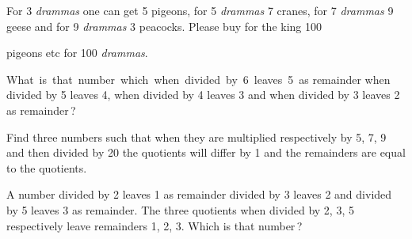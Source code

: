 \documentclass[]{article}
\begin{document}
{For 3 \textit{drammas} one can get 5 pigeons, for 5 \textit{drammas} 7 cranes, for 7
\textit{drammas} 9 geese and for 9 \textit{drammas} 3 peacocks. Please buy for the king
100 }
\newpage
\large

\noindent pigeons etc for 100 \textit{drammas}.

\begin{quote}  {
}  \end{quote}

{What \,is \,that \,number \,which \,when \,divided \,by \,6 \,leaves \,5 \,as remainder when
divided by 5 leaves 4, when divided by 4 leaves 3 and when divided by 3
leaves 2 as remainder\,?}

\begin{quote}  {
}  \end{quote}

{Find three numbers such that when they are multiplied respectively by
5, 7, 9 and then divided by 20 the quotients will differ by 1 and the
remainders are equal to the quotients. }

\begin{quote}  {
}  \end{quote}

{A number divided by 2 leaves 1 as remainder divided by 3 leaves 2 and
divided by 5 leaves 3 as remainder. The three quotients when divided by
2, 3, 5 respectively leave remainders 1, 2, 3. Which is that number\,?}

\begin{quote}  {
}  \end{quote}
\end{document}
